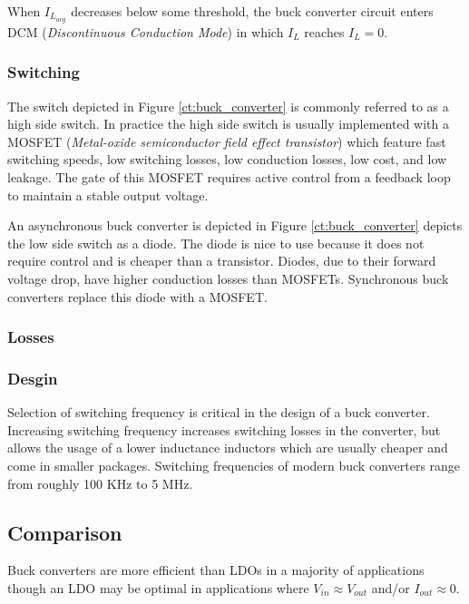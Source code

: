 \documentclass[main.tex]{subfiles}
\begin{document}

When $I_{L_{avg}}$ decreases below some threshold, the buck converter circuit enters DCM (\textit{Discontinuous Conduction Mode}) in which $I_L$ reaches $I_L = 0$.


\subsubsection{Switching}
The switch depicted in Figure \ref{ct:buck_converter} is commonly referred to as a high side switch. In practice the high side switch is usually implemented with a MOSFET (\textit{Metal-oxide semiconductor field effect transistor}) which feature fast switching speeds, low switching losses, low conduction losses, low cost, and low leakage. The gate of this MOSFET requires active control from a feedback loop to maintain a stable output voltage.

An asynchronous buck converter is depicted in Figure \ref{ct:buck_converter} depicts the low side switch as a diode. The diode is nice to use because it does not require control and is cheaper than a transistor. Diodes, due to their forward voltage drop, have higher conduction losses than MOSFETs. Synchronous buck converters replace this diode with a MOSFET. 

\subsubsection{Losses}

\subsubsection{Desgin}
Selection of switching frequency is critical in the design of a buck converter. Increasing switching frequency increases switching losses in the converter, but allows the usage of a lower inductance inductors which are usually cheaper and come in smaller packages. Switching frequencies of modern buck converters range from roughly 100 KHz to 5 MHz. 

\subsection{Comparison}

Buck converters are more efficient than LDOs in a majority of applications though an LDO may be optimal in applications where $V_{in} \approx V_{out}$ and/or $I_{out} \approx 0$. 
\end{document}

